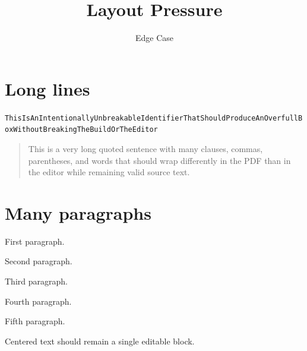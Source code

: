 \documentclass[11pt]{article}
\title{Layout Pressure}
\author{Edge Case}
\begin{document}
\maketitle
\section{Long lines}
\noindent\texttt{ThisIsAnIntentionallyUnbreakableIdentifierThatShouldProduceAnOverfullBoxWithoutBreakingTheBuildOrTheEditor}

\begin{quote}
This is a very long quoted sentence with many clauses, commas, parentheses, and words that should wrap differently in the PDF than in the editor while remaining valid source text.
\end{quote}

\section{Many paragraphs}
First paragraph.

Second paragraph.

Third paragraph.

Fourth paragraph.

Fifth paragraph.

\begin{center}
Centered text should remain a single editable block.
\end{center}
\end{document}
